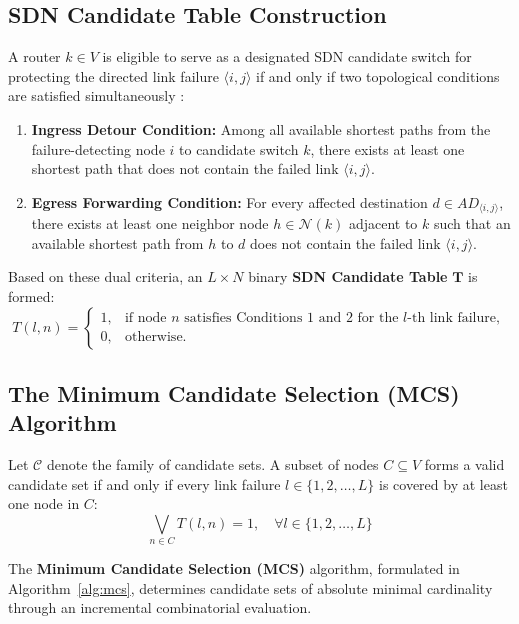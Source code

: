 \subsection{SDN Candidate Table Construction}
A router $k \in V$ is eligible to serve as a designated SDN candidate switch for protecting the directed link failure $\langle i, j \rangle$ if and only if two topological conditions are satisfied simultaneously \cite{vuppalapati2022minimum}:
\begin{enumerate}
    \item \textbf{Ingress Detour Condition:} Among all available shortest paths from the failure-detecting node $i$ to candidate switch $k$, there exists at least one shortest path that does not contain the failed link $\langle i, j \rangle$.
    \item \textbf{Egress Forwarding Condition:} For every affected destination $d \in AD_{\langle i, j \rangle}$, there exists at least one neighbor node $h \in \mathcal{N}(k)$ adjacent to $k$ such that an available shortest path from $h$ to $d$ does not contain the failed link $\langle i, j \rangle$.
\end{enumerate}

Based on these dual criteria, an $L \times N$ binary \textbf{SDN Candidate Table} $\mathbf{T}$ is formed:
\begin{equation}
    T(l, n) = \begin{cases}
        1, & \text{if node } n \text{ satisfies Conditions 1 and 2 for the } l\text{-th link failure}, \\
        0, & \text{otherwise}.
    \end{cases}
\end{equation}

\subsection{The Minimum Candidate Selection (MCS) Algorithm}
Let $\mathcal{C}$ denote the family of candidate sets. A subset of nodes $C \subseteq V$ forms a valid candidate set if and only if every link failure $l \in \{1, 2, \dots, L\}$ is covered by at least one node in $C$:
\begin{equation}
    \bigvee_{n \in C} T(l, n) = 1, \quad \forall l \in \{1, 2, \dots, L\}
\end{equation}

The \textbf{Minimum Candidate Selection (MCS)} algorithm, formulated in Algorithm~\ref{alg:mcs}, determines candidate sets of absolute minimal cardinality through an incremental combinatorial evaluation.

